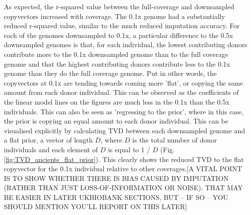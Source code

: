 As expected, the r-squared value between the full-coverage and downsampled copyvectors increased with coverage. The 0.1x genome had a substantially reduced r-squared value, similar to the much reduced imputation accuracy. For each of the genomes downsampled to 0.1x, a particular difference to the 0.5x downsampled genomes is that, for each individual, the lowest contributing donors contribute more to the 0.1x downsampled genome than to the full coverage genome and that the highest contributing donors contribute less to the 0.1x genome than they do the full coverage genome. Put in other words, the copyvectors at 0.1x are tending towards coming more 'flat', or copying the same amount from each donor individual. This can be observed as the coefficients of the linear model lines on the figures are much less in the 0.1x than the 0.5x individuals. This can also be seen as 'regressing to the prior', where in this case, the prior is copying an equal amount to each donor individual. This can be visualised explicitly by calculating TVD between each downsampled genome and a flat prior, a vector of length $D$, where $D$ is the total number of donor individuals and each element of $D$ is equal to 1 / $D$ (Fig. \ref{fig:TVD_ancients_flat_prior}). This clearly shows the reduced TVD to the flat copyvector for the 0.1x individual relative to other coverages.{\color{red}[A VITAL POINT IS TO SHOW WHETHER THERE IS BIAS CAUSED BY IMPUTATION (RATHER THAN JUST LOSS-OF-INFORMATION OR NOISE). THAT MAY BE EASIER IN LATER UKBIOBANK SECTIONS, BUT -- IF SO -- YOU SHOULD MENTION YOU'LL REPORT ON THIS LATER]}

